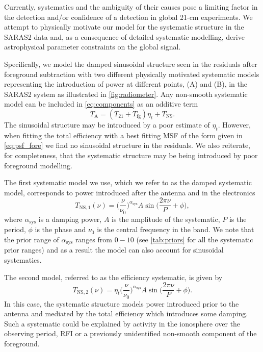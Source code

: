 Currently, systematics and the ambiguity of their causes pose a limiting factor in the detection and/or confidence of a detection in global 21-cm experiments. We attempt to physically motivate our model for the systematic structure in the SARAS2 data and, as a consequence of detailed systematic modelling, derive astrophysical parameter constraints on the global signal.

Specifically, we model the damped sinusoidal structure seen in the residuals after foreground subtraction with two different physically motivated systematic models representing the introduction of power at different points, (A) and (B), in the SARAS2 system as illustrated in \cref{fig:radiometer}. Any non-smooth systematic model can be included in \cref{eq:components} as an additive term
\begin{equation}
    T_\mathrm{A} = (T_{21} + T_\mathrm{fg})\eta_t + T_\mathrm{NS}.
    \label{eq:components_with_sys}
\end{equation}
The sinusoidal structure may be introduced by a poor estimate of $\eta_t$. However, when fitting the total efficiency with a best fitting MSF of the form given in \cref{eq:psf_fore} we find no sinusoidal structure in the residuals.
We also reiterate, for completeness, that the systematic structure may be being introduced by poor foreground modelling.

The first systematic model we use, which we refer to as the damped systematic model, corresponds to power introduced after the antenna and in the electronics \citep[e.g. see Fig. 2 in ][]{SARAS2_radiometer_2018}
\begin{equation}
    T_\mathrm{NS, 1}(\nu) = \bigg(\frac{\nu}{\nu_0}\bigg)^{\alpha_\mathrm{sys}} A \sin\bigg(\frac{2\pi\nu}{P} + \phi\bigg),
    \label{eq:damped_sys}
\end{equation}
where $\alpha_\mathrm{sys}$ is a damping power, $A$ is the amplitude of the systematic, $P$ is the period, $\phi$ is the phase and $\nu_0$ is the central frequency in the band. We note that the prior range of $\alpha_\mathrm{sys}$ ranges from $0 - 10$ (see \cref{tab:priors} for all the systematic prior ranges) and as a result the model can also account for sinusoidal systematics. %

The second model, referred to as the efficiency systematic, is given by
\begin{equation}
    T_\mathrm{NS, 2}(\nu) = \eta_t \bigg(\frac{\nu}{\nu_0}\bigg)^{\alpha_\mathrm{sys}} A \sin\bigg(\frac{2\pi\nu}{P} + \phi\bigg).
    \label{eq:eff_sys}
\end{equation}
In this case, the systematic structure models power introduced prior to the antenna and mediated by the total efficiency which introduces some damping. Such a systematic could be explained by activity in the ionosphere over the observing period, RFI or a previously unidentified non-smooth component of the foreground.

